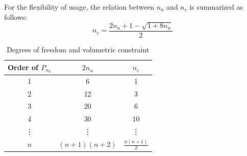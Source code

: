 For the flexibility of usage, the relation between $n_u$ and $n_c$ is summarized as follows:
\begin{equation}
    n_c = \frac{2n_u+1 - \sqrt{1+8n_u}}{2}
\end{equation}
\begin{table}[ht!]
\centering
\caption{Degrees of freedom and volumetric constraint}
\label{tab:constraint}
\begin{tabular}{ccc}
\toprule
    Order of $P_{n_u}$ & $2n_u$ & $n_c$ \\
\midrule
1 & 6 & 1 \\
2 & 12 & 3 \\
3 & 20 & 6 \\
4 & 30 & 10 \\
\vdots & \vdots & \vdots \\
$n$ & $(n+1)(n+2)$ & $\frac{n(n+1)}{2}$ \\
\bottomrule
\end{tabular}
\end{table}
